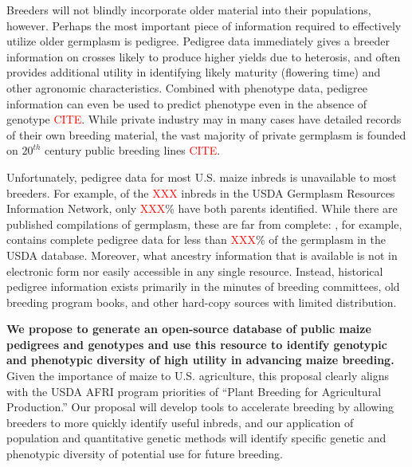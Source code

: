 \documentclass[12pt]{article}
\begin{document}
Breeders will not blindly incorporate older material into their populations, however.  
Perhaps the most important piece of information required to effectively utilize older germplasm is pedigree.
Pedigree data immediately gives a breeder information on crosses likely to produce higher yields due to heterosis, and often provides additional utility in identifying likely maturity (flowering time) and other agronomic characteristics. 
Combined with phenotype data, pedigree information can even be used to predict phenotype even in the absence of genotype \textcolor{red}{CITE}.
%
%
While private industry may in many cases have detailed records of their own breeding material, the vast majority of private germplasm is founded on $20^{th}$ century public breeding lines \textcolor{red}{CITE}.
%
%

Unfortunately, pedigree data for most U.S. maize inbreds is unavailable to most breeders. 
For example, of the \textcolor{red}{XXX} inbreds in the USDA Germplasm Resources Information Network, only \textcolor{red}{XXX}\% have both parents identified. 
While there are published compilations of germplasm, these are far from complete:  \citet{gerdes1993compilation}, for example, contains complete pedigree data for less than \textcolor{red}{XXX}\% of the germplasm in the USDA database.
Moreover, what ancestry information that is available is not in electronic form nor easily accessible in any single resource.  
Instead, historical pedigree information exists primarily in the minutes of breeding committees, old breeding program books, and other hard-copy sources with limited distribution.  

{\bf We propose to  generate an open-source database of public maize pedigrees and genotypes and use this resource to identify genotypic and phenotypic diversity of high utility in advancing maize breeding.}
Given the importance of maize to U.S. agriculture, this proposal clearly aligns with the USDA AFRI program priorities of ``Plant Breeding for Agricultural Production.''  
Our proposal will develop tools to accelerate breeding by allowing breeders to more quickly identify useful inbreds, and our application of population and quantitative genetic methods will identify specific genetic and phenotypic diversity of potential use for future breeding.  
\end{document}

